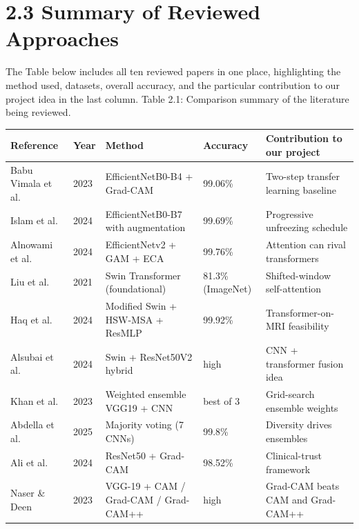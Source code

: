 \documentclass[12pt,a4paper,oneside]{report}
\begin{document}
\section*{2.3 Summary of Reviewed Approaches}
The Table below includes all ten reviewed papers in one place, highlighting the method used, datasets, overall accuracy, and the particular contribution to our project idea in the last column.
Table 2.1: Comparison summary of the literature being reviewed.
\begin{center}
\footnotesize
\begin{tabularx}{\textwidth}{YYYYY}
\toprule
\textbf{Reference} & \textbf{Year} & \textbf{Method} & \textbf{Accuracy} & \textbf{Contribution to our project} \\
\midrule
Babu Vimala et al. & 2023 & EfficientNetB0-B4 + Grad-CAM & 99.06\% & Two-step transfer learning baseline \\
Islam et al. & 2024 & EfficientNetB0-B7 with augmentation & 99.69\% & Progressive unfreezing schedule \\
Alnowami et al. & 2024 & EfficientNetv2 + GAM + ECA & 99.76\% & Attention can rival transformers \\
Liu et al. & 2021 & Swin Transformer (foundational) & 81.3\% (ImageNet) & Shifted-window self-attention \\
Haq et al. & 2024 & Modified Swin + HSW-MSA + ResMLP & 99.92\% & Transformer-on-MRI feasibility \\
Alsubai et al. & 2024 & Swin + ResNet50V2 hybrid & high & CNN + transformer fusion idea \\
Khan et al. & 2023 & Weighted ensemble VGG19 + CNN & best of 3 & Grid-search ensemble weights \\
Abdella et al. & 2025 & Majority voting (7 CNNs) & 99.8\% & Diversity drives ensembles \\
Ali et al. & 2024 & ResNet50 + Grad-CAM & 98.52\% & Clinical-trust framework \\
Naser \& Deen & 2023 & VGG-19 + CAM / Grad-CAM / Grad-CAM++ & high & Grad-CAM beats CAM and Grad-CAM++ \\
\bottomrule
\end{tabularx}
\end{center}
\end{document}

